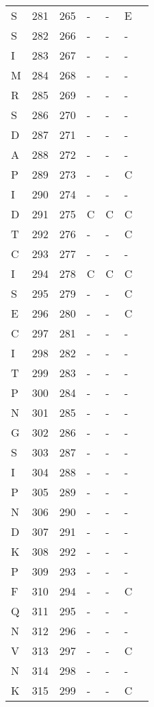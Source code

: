 \documentclass[10pt]{article}
\begin{document}
\begin{longtable}{lllllll}
  S & 281 & 265 & - & - & E &  \\ 
  S & 282 & 266 & - & - & - &  \\ 
  I & 283 & 267 & - & - & - &  \\ 
  M & 284 & 268 & - & - & - &  \\ 
  R & 285 & 269 & - & - & - &  \\ 
  S & 286 & 270 & - & - & - &  \\ 
  D & 287 & 271 & - & - & - &  \\ 
  A & 288 & 272 & - & - & - &  \\ 
  P & 289 & 273 & - & - & C &  \\ 
  I & 290 & 274 & - & - & - &  \\ 
  D & 291 & 275 & C & C & C &  \\ 
  T & 292 & 276 & - & - & C &  \\ 
  C & 293 & 277 & - & - & - &  \\ 
  I & 294 & 278 & C & C & C &  \\ 
  S & 295 & 279 & - & - & C &  \\ 
  E & 296 & 280 & - & - & C &  \\ 
  C & 297 & 281 & - & - & - &  \\ 
  I & 298 & 282 & - & - & - &  \\ 
  T & 299 & 283 & - & - & - &  \\ 
  P & 300 & 284 & - & - & - &  \\ 
  N & 301 & 285 & - & - & - &  \\ 
  G & 302 & 286 & - & - & - &  \\ 
  S & 303 & 287 & - & - & - &  \\ 
  I & 304 & 288 & - & - & - &  \\ 
  P & 305 & 289 & - & - & - &  \\ 
  N & 306 & 290 & - & - & - &  \\ 
  D & 307 & 291 & - & - & - &  \\ 
  K & 308 & 292 & - & - & - &  \\ 
  P & 309 & 293 & - & - & - &  \\ 
  F & 310 & 294 & - & - & C &  \\ 
  Q & 311 & 295 & - & - & - &  \\ 
  N & 312 & 296 & - & - & - &  \\ 
  V & 313 & 297 & - & - & C &  \\ 
  N & 314 & 298 & - & - & - &  \\ 
  K & 315 & 299 & - & - & C &  \\ 

\end{longtable}
\end{document}
